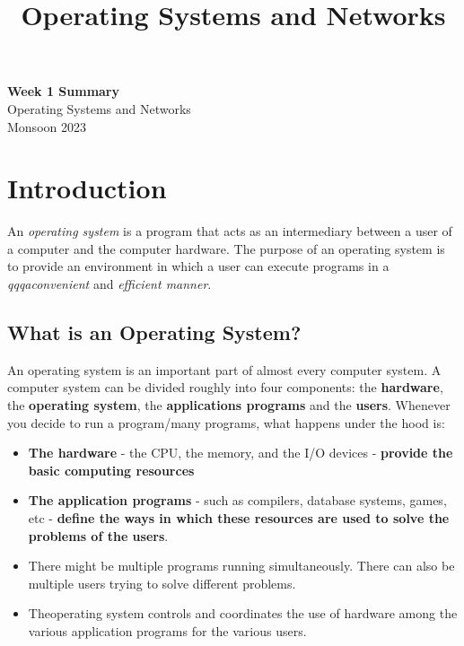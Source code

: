 \documentclass[11pt]{article}
\theoremstyle{definition}
\begin{document}
\title{Operating Systems and Networks}

\thispagestyle{empty}

\begin{center}
{\LARGE \bf Week 1 Summary }\\
{\large Operating Systems and Networks}\\
Monsoon 2023
\end{center}
\section{Introduction}
An \textit{operating system} is a program that acts as an intermediary between a user of a computer and the computer hardware. The purpose of an operating system is to provide an environment in which a user can execute programs in a \textit{qqqaconvenient} and \textit{efficient manner}.
\subsection{What is an Operating System?}
An operating system is an important part of almost every computer system. A computer system can be divided roughly into four components: the \textbf{hardware}, the \textbf{operating system}, the \textbf{applications programs} and the \textbf{users}.
Whenever you decide to run a program/many programs, what happens under the hood is:
\begin{itemize}
    \item \textbf{The hardware} - the CPU, the memory, and the I/O devices - \textbf{provide the basic computing resources}
    \item \textbf{The application programs} - such as compilers, database systems, games, etc - \textbf{define the ways in which these resources are used to solve the problems of the users}.
    \item There might be multiple programs running simultaneously. There can also be multiple users trying to solve different problems.
    \item Theoperating system controls and coordinates the use of hardware among the various application programs for the various users.
\end{itemize}
\end{document}
